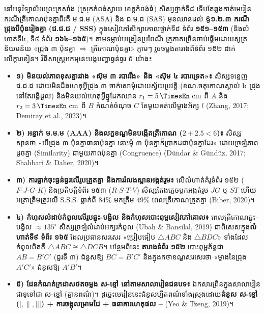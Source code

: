 \documentclass[a4paper,12pt]{article}
\newcommand{\en}[1]{{\TimesEn #1}}
\newcommand{\unit}[1]{\,\text{\en{#1}}}
\newcommand{\cnum}[1]{\text{\fontsize{10.5pt}{12pt}\selectfont\ding{\numexpr181+#1\relax}}}
\newcommand{\tri}[1]{\ensuremath{\triangle #1}}
\newcommand{\cg}{\ensuremath{\cong}}
\begin{document}
នៅអនុវិទ្យាល័យព្រះក្រសាំង (ស្រុកកំពង់ស្វាយ ខេត្តកំពង់ធំ) សិស្សថ្នាក់ទី៨ ទើបតែឆ្លងកាត់មេរៀនករណីត្រីកោណប៉ុនគ្នាពីរគឺ ម.ជ.ម (\en{ASA}) និង ជ.ម.ជ (\en{SAS}) មុនឈានដល់ \textbf{§១.២.៣ ករណី ជ្រុងបីប៉ុនរៀងគ្នា (ជ.ជ.ជ / \en{SSS})} ក្នុងសៀវភៅសិក្សាគោលថ្នាក់ទី៨ ទំព័រ \textbf{១៥១--១៥៣} (និងលំហាត់ទី៤, ទី៩ ទំព័រ \textbf{១៦៤--១៦៥})។ តាមទម្លាប់បង្រៀនប្រពៃណី គ្រូភាគច្រើនចាប់ផ្ដើមដោយសូត្រនិយមន័យ «ជ្រុង ៣ ប៉ុនគ្នា $\Rightarrow$ ត្រីកោណប៉ុនគ្នា» ភ្លាមៗ រួចចម្លងតារាងពីទំព័រ ១៥២ ដាក់លើក្ដារខៀន។ វិធីសាស្ត្រអកម្មនេះបង្កបញ្ហាធ្ងន់ធ្ងរ ៥ យ៉ាង៖
\begin{itemize}[leftmargin=0.55cm, topsep=1pt, itemsep=1.5pt, parsep=0pt]
  \item \textbf{១) មិនយល់ភាពខុសគ្នារវាង «ស៊ុម ៣ របាររឹង» និង «ស៊ុម ៤ របារទ្រេត»៖} សិស្សទន្ទេញ ជ.ជ.ជ ដោយមិនដឹងហេតុអ្វីជ្រុង ៣ ចាក់សោមុំដោយស្វ័យប្រវត្តិ (ខណៈចតុកោណស្គាល់ ៤ ជ្រុងនៅតែរង្គើដួល) និងមិនយល់ហេតុអ្វីធ្នូដែកឈាន $r_1=5\unit{cm}$ ពី $A$ និង $r_2=3\unit{cm}$ ពី $B$ កំណត់ចំណុច $C$ តែមួយគត់លើម្ខាងអ័ក្ស $l$ \en{(Zhang, 2017; Demiray et al., 2023)}។
  \item \textbf{២) អន្ទាក់ ម.ម.ម (\en{AAA}) និងលក្ខខណ្ឌមិនបង្កើតត្រីកោណ ($2+2.5<6$)៖} សិស្សស្មានថា «បើជ្រុង ៣ ប៉ុនគ្នាធានាប៉ុនគ្នា នោះមុំ ៣ ប៉ុនគ្នាក៏ប្រាកដជាប៉ុនគ្នាដែរ» ដោយច្រឡំភាពដូចគ្នា (\en{Similarity}) ជាមួយភាពប៉ុនគ្នា (\en{Congruence}) \en{(Dündar \& Gündüz, 2017; Shahbari \& Daher, 2020)}។
  \item \textbf{៣) ការធ្លាក់ចុះធ្ងន់ធ្ងរលើរូបត្រួតគ្នា និងការរំលងស្ពានអង្កត់រួម៖} លើលំហាត់គំរូទំព័រ ១៥២ ($F\text{-}J\text{-}G\text{-}K$) និងប្រតិបត្តិទំព័រ ១៥៣ ($R\text{-}S\text{-}T\text{-}V$) សិស្សតែងភ្លេចបូកអង្កត់រួម $JG$ ឬ $ST$ ហើយអត្រាត្រឹមត្រូវលើ \en{S.S.S.} ធ្លាក់ពី $84\%$ មកត្រឹម $49\%$ ពេលត្រីកោណត្រួតគ្នា \en{(Biber, 2020)}។
  \item \textbf{៤) កំហុសលំដាប់កំពូលលើរូបឆ្លុះ-បង្វិល និងកំហុសបោះពុម្ពសៀវភៅគោល៖} ពេលត្រីកោណឆ្លុះ-បង្វិល $\approx 135^\circ$ សិស្សច្រឡំលំដាប់អក្សរកំពូល \en{(Ubah \& Bansilal, 2019)} ជាពិសេសក្នុង\textbf{លំហាត់ទី៩ ទំព័រ ១៦៥} ដែលប្រធានសរសេរ «ប្រៀបធៀប $\tri{ABC}$ និង $\tri{BDC}$» ទាំងដែលកំពូលពិតគឺ $\tri{ABC} \cg \tri{DCB}$។ បន្ថែមពីនេះ \textbf{តារាងទំព័រ ១៥២} បោះពុម្ពភ័ន្តជា $AB = B'C'$ (ជួរទី ៣) ជំនួសឱ្យ \textbf{$BC = B'C'$} និងក្នុងកថាខណ្ឌសរសេរថា «ម្ខាងនៃជ្រុង $A'C'$» ជំនួសឱ្យ \textbf{$A'B'$}។
  \item \textbf{៥) ដែនកំណត់ក្រដាសថតចម្លង ស-ខ្មៅ នៅតាមសាលារៀនជនបទ៖} ឯកសារព្រីនក្នុងសាលារៀនជាទូទៅជា ស-ខ្មៅ (គ្មានពណ៌)។ ដូច្នេះមេរៀននេះជំនួសហ្វឺតពណ៌ទាំងស្រុងដោយ\textbf{គំនូស ស-ខ្មៅ ($|, \parallel, |||$) + ការចង្អុលម្រាមដៃ \en{[tracing]} + ធនាគារហេតុផល \cnum{1}--\cnum{5}} \en{(Yeo \& Tzeng, 2019)}។
\end{itemize}
\end{document}
